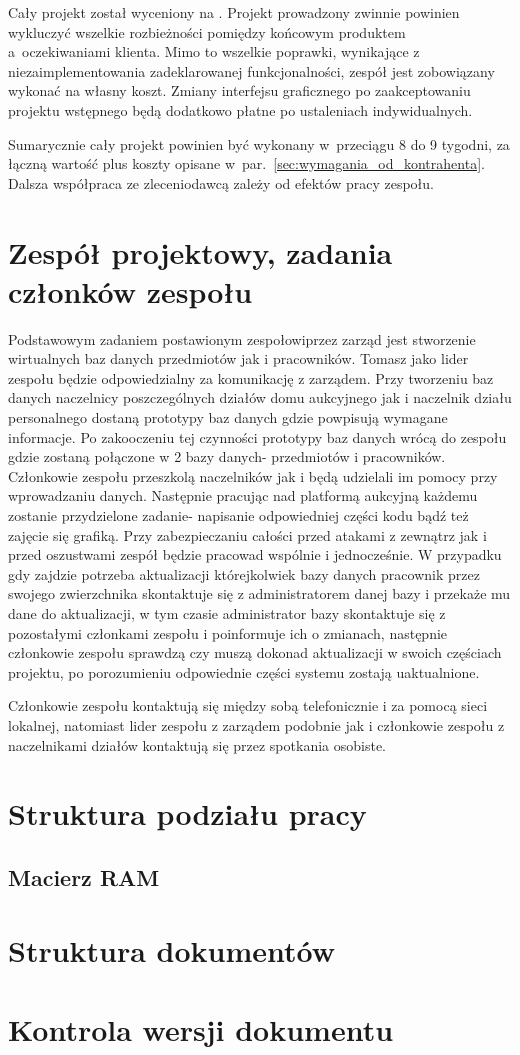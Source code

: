\documentclass[10pt,a4paper]{article}
\begin{document}
Cały projekt został wyceniony na . Projekt prowadzony zwinnie
powinien wykluczyć wszelkie rozbieżności pomiędzy końcowym produktem
a~oczekiwaniami klienta. Mimo to wszelkie poprawki, wynikające z
niezaimplementowania zadeklarowanej funkcjonalności, zespół jest zobowiązany
wykonać na własny koszt. Zmiany interfejsu graficznego po zaakceptowaniu
projektu wstępnego będą dodatkowo płatne po ustaleniach indywidualnych.

Sumarycznie cały projekt powinien być wykonany w~przeciągu 8 do 9 tygodni, za
łączną wartość  plus koszty opisane
w~par.~\ref{sec:wymagania_od_kontrahenta}. Dalsza współpraca ze zleceniodawcą
zależy od efektów pracy zespołu.

\section{Zespół projektowy, zadania członków zespołu}

Podstawowym zadaniem postawionym zespołowiprzez zarząd jest stworzenie
wirtualnych baz danych przedmiotów jak i pracowników. Tomasz jako lider zespołu
będzie odpowiedzialny za komunikację z zarządem. Przy tworzeniu baz danych
naczelnicy poszczególnych działów domu aukcyjnego jak i naczelnik działu
personalnego dostaną prototypy baz danych gdzie powpisują wymagane informacje.
Po zakooczeniu tej czynności prototypy baz danych wrócą do zespołu gdzie
zostaną połączone w 2 bazy danych- przedmiotów i pracowników. Członkowie
zespołu przeszkolą naczelników jak i będą udzielali im pomocy przy wprowadzaniu
danych. Następnie pracując nad platformą aukcyjną	każdemu zostanie przydzielone
zadanie- napisanie odpowiedniej części kodu bądź też zajęcie się grafiką. Przy
zabezpieczaniu całości przed atakami z zewnątrz jak i przed oszustwami zespół
będzie pracowad wspólnie i jednocześnie. W przypadku gdy zajdzie potrzeba
aktualizacji którejkolwiek bazy danych pracownik przez swojego zwierzchnika
skontaktuje się z administratorem danej bazy i przekaże mu dane do
aktualizacji, w tym czasie administrator bazy skontaktuje się z pozostałymi
członkami zespołu i poinformuje ich o zmianach, następnie członkowie zespołu
sprawdzą czy muszą dokonad aktualizacji w swoich częściach projektu, po
porozumieniu odpowiednie części systemu zostają uaktualnione.

Członkowie zespołu kontaktują się między sobą telefonicznie i za pomocą sieci
lokalnej, natomiast lider zespołu z zarządem podobnie jak i członkowie zespołu
z naczelnikami działów kontaktują się przez spotkania osobiste.

\section{Struktura podziału pracy}
\subsection{Macierz RAM}

\section{Struktura dokumentów}

\section{Kontrola wersji dokumentu}
\end{document}
